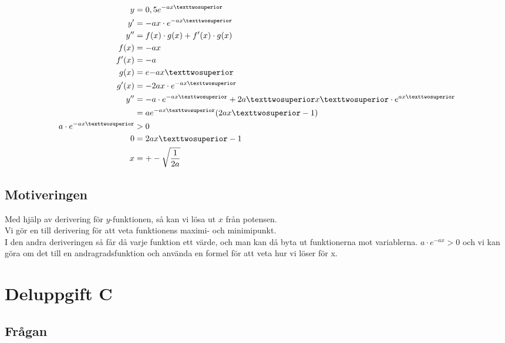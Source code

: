 \documentclass[a4paper,12pt]{article}
\begin{document}
      \begin{align}
        y &= 
        0,5e^{-ax²} 
         \\
        y^{\prime} &= 
        -ax \cdot e^{-ax²} 
         \\
        y^{\prime \prime} &= 
        f(x) \cdot g(x) + f^{\prime}(x) \cdot g(x) 
         \\
        f(x) &= -ax 
        \nonumber \\
        f^{\prime}(x) &= -a
        \nonumber \\
        g(x) &= e{-ax²}
        \nonumber \\
        g^{\prime}(x) &= 
        -2ax \cdot e^{-ax²}
        \nonumber \\
        y^{\prime \prime} &= 
        -a \cdot e^{-ax²} + 2a²x² \cdot e^{\-ax²} 
         \nonumber \\
        &= ae^{-ax²}(2ax²-1)
        \nonumber \\
        a \cdot e^{-ax²} &> 0 
        \nonumber \\
        0 &= 2ax²-1 
        \nonumber \\
        x &= +-\sqrt{\frac{1}{2a}}
      \end{align}

      \newpage
    \subsection{Motiveringen}

      Med hjälp av derivering för $y$-funktionen, så kan vi lösa ut $x$ från potensen. \\
      Vi gör en till derivering för att veta funktionens maximi- och minimipunkt. \\
      I den andra deriveringen så får då varje funktion ett värde, och man kan
      då byta ut funktionerna mot variablerna. $a \cdot e^{-ax} > 0$ och vi kan 
      göra om det till en andragradsfunktion och använda en formel för att 
      veta hur vi löser för x.

\section{Deluppgift C}
\label{sec:uppg3}

  \subsection{Frågan}
  
\end{document}
